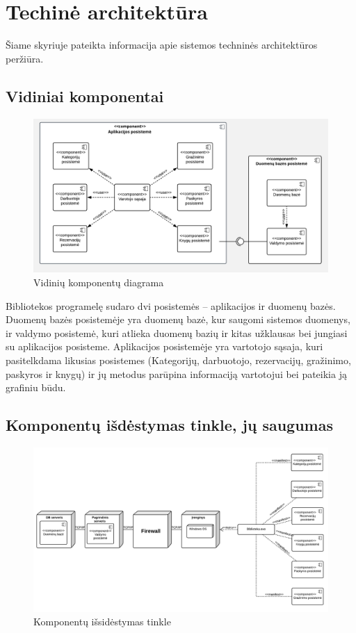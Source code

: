 \documentclass{VUMIFPSkursinis}
\begin{document}
\section{Techinė architektūra}
Šiame skyriuje pateikta informacija apie sistemos techninės architektūros peržiūra.
\subsection{Vidiniai komponentai}

\begin{figure}[H]  
    \label{fig:innerComponents}
    \centering
    \includegraphics[width=1.1\textwidth]{Robastiskumo/innerComponents}
    \caption{Vidinių komponentų diagrama}
\end{figure}

Bibliotekos programelę sudaro dvi posistemės – aplikacijos ir duomenų bazės.
Duomenų bazės posistemėje yra duomenų bazė, kur saugomi sistemos duomenys, ir valdymo
posistemė, kuri atlieka duomenų bazių ir kitas užklausas bei jungiasi su aplikacijos posisteme.
Aplikacijos posistemėje yra vartotojo sąsaja, kuri pasitelkdama likusias posistemes (Kategorijų, darbuotojo, rezervacijų, gražinimo, paskyros ir knygų) ir jų metodus parūpina informaciją vartotojui
bei pateikia ją grafiniu būdu.

\subsection{Komponentų išdėstymas tinkle, jų saugumas}

\begin{figure}[H]
    \label{fig:networkComponents}
    \centering
    \includegraphics[width=1 \textwidth]{Robastiskumo/networkComponents}
    \caption{Komponentų išsidėstymas tinkle}
\end{figure}
\end{document}
